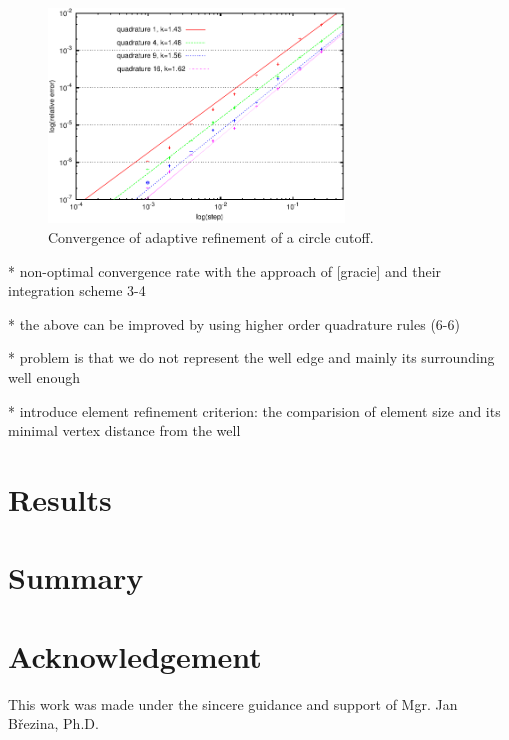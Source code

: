 \documentclass[preprint,12pt,authoryear]{elsarticle}
\begin{document}
\begin{figure}[!htb]
  \centering    
  \includegraphics[width=0.7\textwidth]{results/adaptive_integration.pdf}
  \caption[Adaptive refinement convergence]{Convergence of adaptive refinement of a circle cutoff.}
  \label{fig:adapt_ref_convergence}
\end{figure}


* non-optimal convergence rate with the approach of [gracie] and their integration scheme 3-4

* the above can be improved by using higher order quadrature rules (6-6)

* problem is that we do not represent the well edge and mainly its surrounding well enough

* introduce element refinement criterion: the comparision of element size and its minimal vertex distance 
  from the well

\section{Results}
\label{sec:results}

\section{Summary}
\label{sec:summary}

\section{Acknowledgement}
This work was made under the sincere guidance and support of Mgr. Jan B{\v r}ezina, Ph.D.
\end{document}
